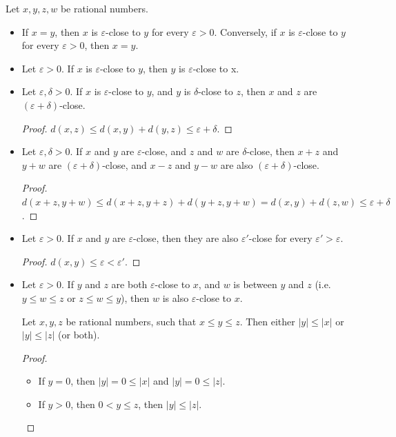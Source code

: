 \documentclass{blog}
\begin{document}
\begin{proposition}
  Let $x, y, z, w$ be rational numbers.
  \begin{itemize}
  \item If $x = y$, then $x$ is $\varepsilon$-close to $y$ for every $\varepsilon > 0$.
    Conversely, if $x$ is $\varepsilon$-close to $y$ for every $\varepsilon > 0$,
    then $x = y$.
  \item Let $\varepsilon > 0$. If $x$ is $\varepsilon$-close to $y$,
    then $y$ is $\varepsilon$-close to x.
  \item Let $\varepsilon, \delta > 0$. If $x$ is $\varepsilon$-close to $y$,
    and $y$ is $\delta$-close to $z$,
    then $x$ and $z$ are $(\varepsilon + \delta)$-close.
    \begin{proof}
      $d(x, z) \leq d(x, y) + d(y, z) \leq \varepsilon + \delta$.
    \end{proof}
  \item Let $\varepsilon, \delta > 0$. If $x$ and $y$ are $\varepsilon$-close,
    and $z$ and $w$ are $\delta$-close,
    then $x + z$ and $y + w$ are $(\varepsilon + \delta)$-close,
    and $x - z$ and $y - w$ are also $(\varepsilon + \delta)$-close.
    \begin{proof}
      $d(x + z, y + w) \leq d(x + z, y + z) + d(y + z, y + w) = d(x, y) + d(z, w) \leq \varepsilon + \delta$.
    \end{proof}
  \item Let $\varepsilon > 0$. If $x$ and $y$ are $\varepsilon$-close,
    then they are also $\varepsilon'$-close for every $\varepsilon' > \varepsilon$.
    \begin{proof}
      $d(x, y) \leq \varepsilon < \varepsilon'$.
    \end{proof}
  \item Let $\varepsilon > 0$. If $y$ and $z$ are both $\varepsilon$-close to $x$,
    and $w$ is between $y$ and $z$ (i.e. $y \leq w \leq z$ or $z \leq w \leq y$),
    then $w$ is also $\varepsilon$-close to $x$.
    \begin{lemma}
      Let $x, y, z$ be rational numbers, such that $x \leq y \leq z$.
      Then either $|y| \leq |x|$ or $|y| \leq |z|$ (or both).
    \end{lemma}
    \begin{proof}~
      \begin{itemize}
      \item If $y = 0$, then $|y| = 0 \leq |x|$ and $|y| = 0 \leq |z|$.
      \item If $y > 0$, then $0 < y \leq z$, then $|y| \leq |z|$.

\end{itemize}
\end{proof}
\end{itemize}
\end{proposition}
\end{document}
